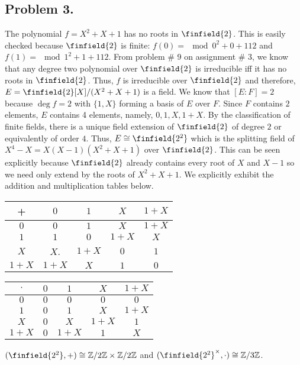 \documentclass[12pt]{extarticle}
\begin{document}
\subsection*{Problem 3.}
The polynomial $f = X^2 + X + 1$ has no roots in $\finfield{2}$. This is easily checked because $\finfield{2}$ is finite: $f(0) = \mod{0^2 + 0 + 1}{1}{2}$ and $f(1) = \mod{1^2 + 1 + 1}{1}{2}$. From problem \# 9 on assignment \# 3, we know that any degree two polynomial over $\finfield{2}$ is irreducible iff it has no roots in $\finfield{2}$. Thus, $f$ is irreducible over $\finfield{2}$ and therefore, $E = \finfield{2}[X]/(X^2 + X + 1)$ is a field. We know that $[E : F] = 2$ because $\deg{f} = 2$ with $\{1, X\}$ forming a basis of $E$ over $F$. Since $F$ contains $2$ elements, $E$ contains 4 elements, namely, $0, 1, X, 1 + X$. By the classification of finite fields, there is a unique field extension of $\finfield{2}$ of degree $2$ or equivalently of order $4$. Thus, $E \cong \finfield{2^2}$ which is the splitting field of $X^4 - X = X(X-1)(X^2 + X + 1)$ over $\finfield{2}$. This can be seen explicitly because $\finfield{2}$ already contains every root of $X$ and $X-1$ so we need only extend by the roots of $X^2 + X + 1$. We explicitly exhibit the addition and multiplication tables below.
\begin{center}
\begin{tabular}{ c | c c c c}
 + & $0$ & $1$ & $X$ & $1 + X$ \\
\hline
 $0$ & $0$ & $1$ & $X$ & $1 + X$ \\ 
 $1$ & $1$ & $0$ & $1 + X$ & $X$ \\  
 $X$ & $X$. & $1 + X$ & $0$ & $1$ \\
 $1 + X$ & $1 + X$ & $X$ & $1$ & $0$ 
\end{tabular}
\quad
\begin{tabular}{ c | c c c c}
$\cdot$ & $0$ & $1$ & $X$ & $1 + X$ \\
\hline
 $0$ & $0$ & $0$ & $0$ & $0$ \\ 
 $1$ & $0$ & $1$ & $X$ & $1 + X$ \\  
 $X$ & $0$ & $X$ & $1 + X$ & $1$ \\
 $1 + X$ & $0$ & $1 + X$ & $1$ & $X$ 
\end{tabular}
\end{center}
$(\finfield{2^2}, +) \cong \Z/2\Z \times \Z/2\Z$ and $(\finfield{2^2}^\times, \cdot) \cong \Z/3\Z$.
\end{document}
